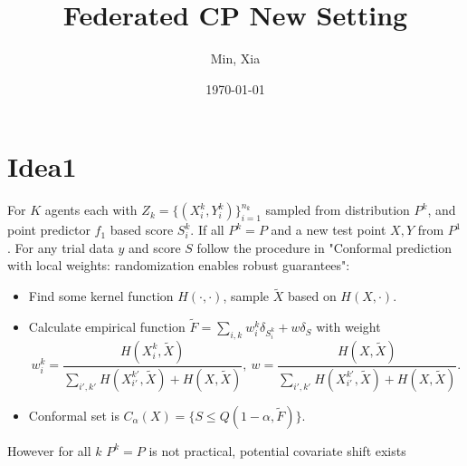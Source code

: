 \documentclass[12pt, a4paper, oneside]{article}
\title{\textbf{Federated CP New Setting}}
\author{Min, Xia}
\date{\today}
\begin{document}
\maketitle
\setcounter{page}{1}
\section{Idea1}
    For $K$ agents each with $Z_k=\{(X_i^k,Y_i^k)\}_{i=1}^{n_k}$ sampled from distribution $P^k$, and point predictor $f_1$ based score $S_i^k$. If all $P^k=P$ and a new test point $X,Y$ from $P^1$. For any trial data $y$ and score $S$ follow the procedure in "Conformal prediction with local weights: randomization enables robust guarantees"\cite{hore2023conformal}:
    \begin{itemize}
        \item Find some kernel function $H(\cdot,\cdot)$, sample $\tilde{X}$ based on $H(X,\cdot)$.
        \item Calculate empirical function $\tilde{F}=\overset{}{\underset{i,k}\sum}w_i^k\delta_{S_i^k}+w\delta_{S}$ with weight
        \begin{equation*}
            w_i^k=\dfrac{H(X_i^k,\tilde{X})}{\overset{}{\underset{i',k'}\sum}H(X_{i'}^{k'},\tilde{X})+H(X,\tilde{X})},\ w=\dfrac{H(X,\tilde{X})}{\overset{}{\underset{i',k'}\sum}H(X_{i'}^{k'},\tilde{X})+H(X,\tilde{X})}.
        \end{equation*}
        \item Conformal set is $C_\alpha(X)=\{S\leq Q(1-\alpha,\tilde{F})\}$.
    \end{itemize}


    However for all $k$ $P^k=P$ is not practical, potential covariate shift exists
\newpage


\end{document}
